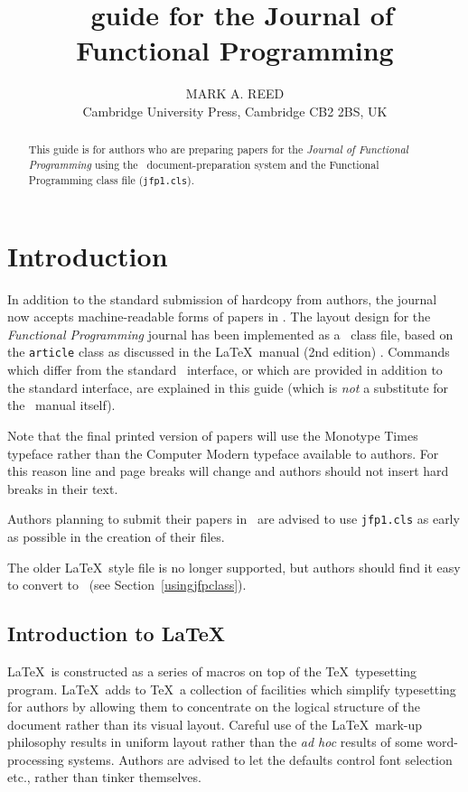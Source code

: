 \documentclass{jfp1}
\title[Journal of Functional Programming]
      {\LaTeXe\ guide for the Journal of Functional Programming}
\author[M. A. Reed]
        {MARK A. REED\\
         Cambridge University Press, Cambridge CB2 2BS, UK\\
         \email{texline@cambridge.org}}
\begin{document}
\label{firstpage}

\maketitle

\begin{abstract}
This guide is for authors who are preparing papers for the \emph{Journal of
Functional Programming} using the \LaTeXe\ document-preparation system
and the Functional Programming class file (\texttt{jfp1.cls}).
\end{abstract}

\tableofcontents

\section{Introduction}

In addition to the standard submission of hardcopy from authors, the
journal now accepts machine-readable forms of papers
in \LaTeXe. The layout design for the \emph{Functional Programming} journal
has been implemented as a \LaTeXe\ class file, based on the \verb"article"
class as discussed in the \LaTeX\ manual (2nd edition) \cite{LaTeX}.
Commands which differ from the standard \LaTeXe\ interface, or which are
provided in addition to the standard interface, are explained in this
guide (which is \emph{not} a substitute for the \LaTeXe\ manual itself).

Note that the final printed version of papers will use the Monotype Times
typeface rather than the Computer Modern typeface available to authors. For
this reason line and page breaks will change and authors should not insert
hard breaks in their text.

Authors planning to submit their papers in \LaTeXe\ are advised to use
\verb"jfp1.cls" as early as possible in the creation of their files.

The older \LaTeX\ style file is no longer supported, but authors should
find it easy to convert to \LaTeXe\ (see Section~\ref{usingjfpclass}).

\subsection{Introduction to \LaTeX}

\LaTeX\ is constructed as a series of macros on top of the \TeX\ typesetting
program. \LaTeX\ adds to \TeX\ a collection of facilities which simplify
typesetting for authors by allowing them to concentrate on the logical
structure of the document rather than its visual layout. Careful use of the
\LaTeX\ mark-up philosophy results in uniform layout rather than the
\emph{ad hoc} results of some word-processing systems. Authors are advised to
let the defaults control font selection etc., rather than tinker themselves.
\end{document}
